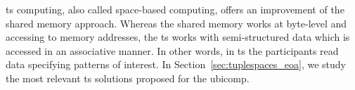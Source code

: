\acl{ts} computing, also called space-based computing, offers an improvement of the shared memory approach.
Whereas the shared memory works at byte-level and accessing to memory addresses,
the \acl{ts} works with semi-structured data which is accessed in an associative manner.
In other words, in \ac{ts} the participants read data specifying patterns of interest.
In Section~\ref{sec:tuplespaces_eoa}, we study the most relevant \acl{ts} solutions proposed for the \acl{ubicomp}.



